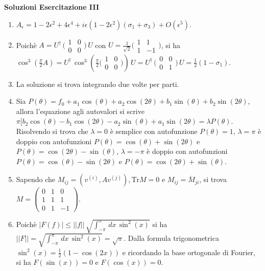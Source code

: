 \documentclass[a4paper,10pt]{article}
\begin{document}
\vskip10pt

\centerline{\LARGE \bf Soluzioni Esercitazione III}
\begin{enumerate}
\item $A_\epsilon = 1-2\epsilon^2 + 4 \epsilon^4 +i\epsilon(1-2\epsilon^2) (\sigma_1+\sigma_3) +O(\epsilon^5)$.
\item Poich\`e $A= U^{\dag}\,\bigl( \begin{smallmatrix} 1 & 0 \\ 0 & 0 \end{smallmatrix} \bigr)\,U$ con $U=\frac{1}{\sqrt 2}\bigl( \begin{smallmatrix} 1 & 1 \\ 1 & -1 \end{smallmatrix} \bigr)$, si ha $\cos^3(\frac{\pi}{2} A)=U^{\dag}\,\cos^3(\frac{\pi}{2}\bigl( \begin{smallmatrix} 1 & 0 \\ 0 & 0 \end{smallmatrix} \bigr))\,U=U^{\dag}\,\bigl( \begin{smallmatrix} 0 & 0 \\ 0 & 1 \end{smallmatrix} \bigr)\,U=\frac12 (1-\sigma_1)$. 
\item La soluzione si trova integrando due volte per parti.
\item Sia $P(\theta)=f_0 + a_1 \cos(\theta) +a_2 \cos(2\theta)+ b_1 \sin(\theta) + b_2\sin(2\theta)$, allora l'equazione agli autovalori si scrive $\pi[b_2\cos(\theta)-b_1\cos(2\theta) -a_2 \sin(\theta)+ a_1 \sin(2\theta)=\lambda P(\theta)$. Risolvendo si trova che $\lambda =0$ \`e semplice con autofunzione $P(\theta)=1$, $\lambda=\pi$ \`e doppio con autofunzioni $P(\theta)= \cos(\theta) +\sin(2\theta)$ e $P(\theta)=\cos(2\theta) - \sin(\theta)$, $\lambda= -\pi$ \` e doppio con autofunzioni  $P(\theta)= \cos(\theta) -\sin(2\theta)$ e $P(\theta)=\cos(2\theta) + \sin(\theta)$.
\item Sapendo che $M_{ij}=(v^{(i)}, Av^{(j)}), \text{Tr}M=0$ e $M_{ij}=\overline{M}_{ji}$, si trova $M=\begin{pmatrix} 0 & 1 & 0 \\ 1 & 1 & 1 \\ 0 & 1 & -1 \end{pmatrix}$.
\item Poich\`e $|F(f)|\leq||f||\,\sqrt{\int_{-\pi}^{\pi}\,dx\,\sin^2(x)}$ si ha $||F||= \sqrt{\int_{-\pi}^{\pi}\,dx\,\sin^2(x)}=\sqrt{\pi}$. Dalla formula trigonometrica $\sin^2(x)=\frac12 (1-\cos(2x))$ e ricordando la base ortogonale di Fourier, si ha $F(\sin(x))=0$ e $F(\cos(x))=0$.

\end{enumerate}
\end{document}
